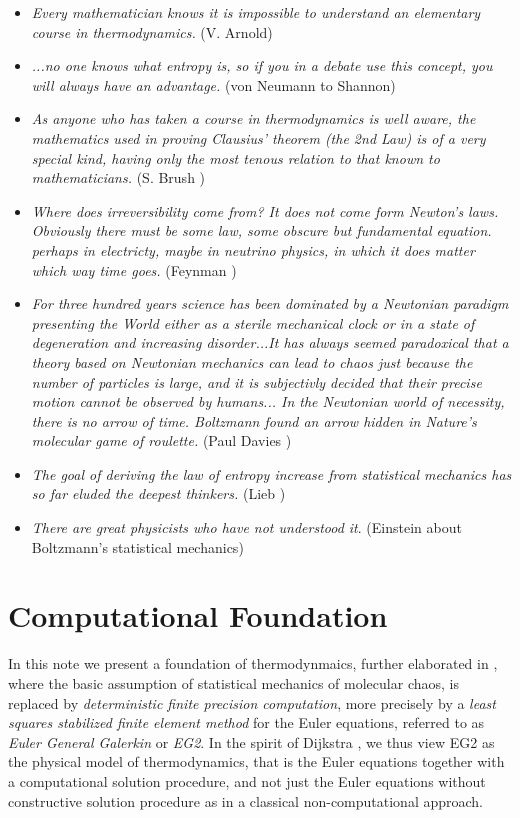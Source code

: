 \small
\begin{itemize}
\item \emph{Every mathematician knows it is impossible to understand
an elementary course in thermodynamics.} (V. Arnold)
\item \emph{...no one knows what entropy is, so if you in a debate use
this concept, you will always have an advantage.} (von Neumann to
Shannon)
\item \emph{As anyone who has taken a course in thermodynamics is well
aware, the mathematics used in proving Clausius' theorem (the 2nd Law)
is of a very special kind, having only the most tenous relation to
that known to mathematicians.} (S. Brush \cite{brush})
\item \emph{Where does irreversibility come from? It does not come
form Newton's laws. Obviously there must be some law, some obscure but
fundamental equation. perhaps in electricty, maybe in neutrino
physics, in which it does matter which way time goes.} (Feynman
\cite{feynman})
\item
\emph{For three hundred years science has been dominated by a
Newtonian paradigm presenting the World either as a sterile mechanical
clock or in a state of degeneration and increasing disorder...It has
always seemed paradoxical that a theory based on Newtonian mechanics
can lead to chaos just because the number of particles is large, and
it is subjectivly decided that their precise motion cannot be observed
by humans... In the Newtonian world of necessity, there is no arrow of
time. Boltzmann found an arrow hidden in Nature's molecular game of
roulette.}  (Paul Davies \cite{davies})
\item \emph{The goal of deriving the law of entropy increase
from statistical mechanics has so far eluded the deepest
thinkers.} (Lieb \cite{lieb})
\item \emph{There are great physicists who have not understood it}.
(Einstein about Boltzmann's statistical mechanics) 
\end{itemize}
\normalsize
 
\section{Computational Foundation}   

In this note we present a foundation of thermodynmaics, further
elaborated in \cite{hoffman,ambsthermo}, where the basic assumption of
statistical mechanics of molecular chaos, is replaced by
\emph{deterministic finite precision computation}, more precisely by a
\emph{least squares stabilized finite element method} for the Euler
equations, referred to as \emph{Euler General Galerkin} or \emph{EG2}.
In the spirit of Dijkstra \cite{dijkstra}, we thus view EG2 as the
physical model of thermodynamics, that is the Euler equations together
with a computational solution procedure, and not just the Euler
equations without constructive solution procedure as in a classical
non-computational approach.

